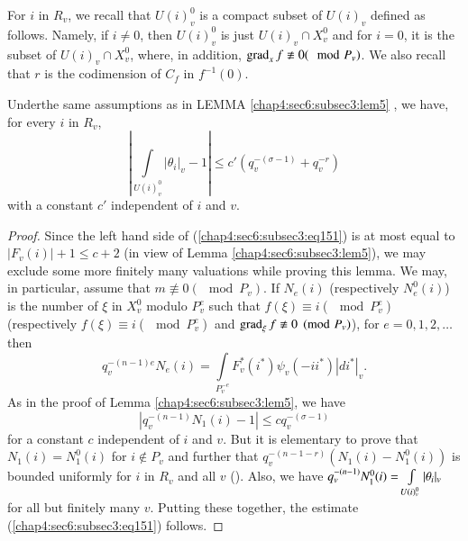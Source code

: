 For $i$ in $R_{v}$, we recall that $U(i)^{0}_{v}$ is a compact subset
of $U(i)_{v}$ defined as follows. Namely, if $i\neq 0$, then
$U(i)^{0}_{v}$ is just $U(i)_{v}\cap X^{0}_{v}$ and for $i=0$, it is
the subset of $U(i)_{v}\cap X^{0}_{v}$, where, in addition,
$\operatorname{grad}_{x}f\not\equiv 0(\mod P_{v})$. We also recall that $r$ is the
codimension of $C_{f}$ in $f^{-1}(0)$.

\begin{lemma}\label{chap4:sec6:subsec3:lem6} %
  Under\pageoriginale the same assumptions as in
  LEMMA \ref{chap4:sec6:subsec3:lem5} , we
  have, for every $i$ in $R_{v}$,
  \begin{equation*}
    \left|\int\limits_{U(i)^{0}_{v}}|\theta_{i}|_{v}-1\right|\leq
    c'(q^{-(\sigma-1)}_{v}+q^{-r}_{v})
    \tag{151}\label{chap4:sec6:subsec3:eq151}  
  \end{equation*}
  with a constant $c'$ independent of $i$ and $v$.
\end{lemma}

\begin{proof}
Since the left hand side of (\ref{chap4:sec6:subsec3:eq151}) is at most equal to
$|F_{v}(i)|+1\leq c+2$ (in view of Lemma \ref{chap4:sec6:subsec3:lem5}), we may exclude
some more finitely many valuations while proving this lemma. We may,
in particular, assume that $m\not\equiv 0(\mod P_{v})$. If $N_{e}(i)$
(respectively $N^{0}_{e}(i)$) is the number of $\xi$ in $X^{0}_{v}$
modulo $P^{e}_{v}$ such that $f(\xi)\equiv i(\mod P^{e}_{v})$
(respectively $f(\xi)\equiv i(\mod P^{e}_{v})$ and
$\operatorname{grad}_{\xi}f\not\equiv 0\pmod{P_{v}}$), for $e=0,1,2,\ldots$ then
$$
q^{-(n-1)e}_{v}N_{e}(i)=\int\limits_{P^{-e}_{v}}F^{\ast}_{v}
(i^{\ast})\psi_{v}(-ii^{\ast})|di^{\ast}|_{v}.
$$
As in the proof of Lemma \ref{chap4:sec6:subsec3:lem5}, we have
$$
|q^{-(n-1)}_{v}N_{1}(i)-1|\leq cq^{-(\sigma-1)}_{v}
$$
for a constant $c$ independent of $i$ and $v$. But it is elementary to
prove that $N_{1}(i)=N^{0}_{1}(i)$ for $i\not\in P_{v}$ and further
that $q_{v}^{-(n-1-r)}(N_{1}(i)-N^{0}_{1}(i))$ is bounded uniformly
for $i$ in $R_{v}$ and all $v$ (\cite{Lang-Weil}). Also, we have
$q^{-(n-1)}_{v}\break N^{0}_{1}(i)=\int\limits_{U(i)^{0}_{v}}|\theta_{i}|_{v}$
for all but finitely many $v$. Putting these together, the estimate
(\ref{chap4:sec6:subsec3:eq151}) follows.
\end{proof}

